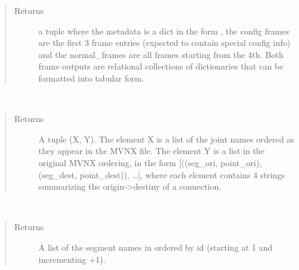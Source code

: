 \documentclass[letterpaper,10pt,english,openany,oneside]{sphinxmanual}
\begin{document}
\begin{fulllineitems}
\begin{fulllineitems}
\begin{quote}
\begin{description}
\item[{Returns}] \leavevmode
a tuple 
where the metadata is a dict in the form , the config frames are the
first 3 frame entries (expected to contain special config info)
and the normal\_frames are all frames starting from the 4th. Both
frame outputs are relational collections of dictionaries that can be
formatted into tabular form.

\end{description}\end{quote}

\end{fulllineitems}


\begin{fulllineitems}
\label{\detokenize{io_anim_mvnx:io_anim_mvnx.mvnx.Mvnx.extract_joints}}~\begin{quote}\begin{description}
\item[{Returns}] \leavevmode
A tuple (X, Y). The element X is a list of the joint names
ordered as they appear in the MVNX file.
The element Y is a list in the original MVNX ordering, in the form
{[}((seg\_ori, point\_ori), (seg\_dest, point\_dest)), …{]}, where each
element contains 4 strings summarizing the origin-\textgreater{}destiny of a
connection.

\end{description}\end{quote}

\end{fulllineitems}


\begin{fulllineitems}
\label{\detokenize{io_anim_mvnx:io_anim_mvnx.mvnx.Mvnx.extract_segments}}~\begin{quote}\begin{description}
\item[{Returns}] \leavevmode
A list of the segment names in 
ordered by id (starting at 1 and incrementing +1).

\end{description}\end{quote}

\end{fulllineitems}


\end{fulllineitems}
\end{document}
